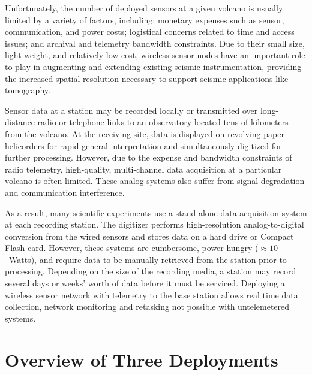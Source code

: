Unfortunately, the number of deployed sensors at a given volcano is usually
limited by a variety of factors, including: monetary expenses such as sensor,
communication, and power costs; logistical concerns related to time and access
issues; and archival and telemetry bandwidth constraints. Due to their small
size, light weight, and relatively low cost, wireless sensor nodes have an
important role to play in augmenting and extending existing seismic
instrumentation, providing the increased spatial resolution necessary to
support seismic applications like tomography.

Sensor data at a station may be recorded locally or transmitted over
long-distance radio or telephone links to an observatory located tens of
kilometers from the volcano.  At the receiving site, data is displayed on
revolving paper helicorders for rapid general interpretation and
simultaneously digitized for further processing.  However, due to the expense
and bandwidth constraints of radio telemetry, high-quality, multi-channel
data acquisition at a particular volcano is often limited. These analog
systems also suffer from signal degradation and communication interference.

As a result, many scientific experiments use a stand-alone data acquisition
system at each recording station.  The digitizer performs high-resolution
analog-to-digital conversion from the wired sensors and stores data on a hard
drive or Compact Flash card. However, these systems are cumbersome, power
hungry ($\approx 10$~Watts), and require data to be manually retrieved from
the station prior to processing. Depending on the size of the recording
media, a station may record several days or weeks' worth of data before it
must be serviced. Deploying a wireless sensor network with telemetry to the
base station allows real time data collection, network monitoring and
retasking not possible with untelemetered systems.

\section{Overview of Three Deployments}

